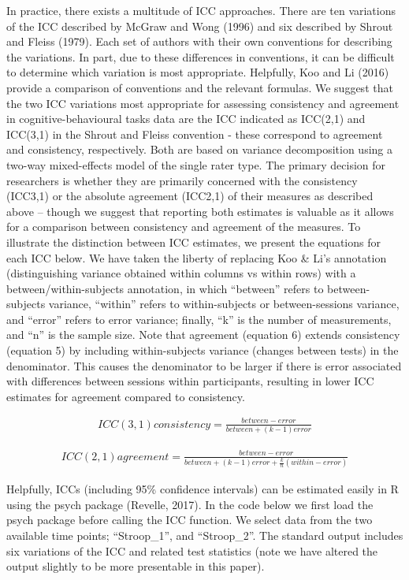 \documentclass[english,,man,floatsintext]{apa6}
\begin{document}
In practice, there exists a multitude of ICC approaches. There are ten variations of the ICC described by McGraw and Wong (1996) and six described by Shrout and Fleiss (1979). Each set of authors with their own conventions for describing the variations. In part, due to these differences in conventions, it can be difficult to determine which variation is most appropriate. Helpfully, Koo and Li (2016) provide a comparison of conventions and the relevant formulas. We suggest that the two ICC variations most appropriate for assessing consistency and agreement in cognitive-behavioural tasks data are the ICC indicated as ICC(2,1) and ICC(3,1) in the Shrout and Fleiss convention - these correspond to agreement and consistency, respectively. Both are based on variance decomposition using a two-way mixed-effects model of the single rater type. The primary decision for researchers is whether they are primarily concerned with the consistency (ICC3,1) or the absolute agreement (ICC2,1) of their measures as described above -- though we suggest that reporting both estimates is valuable as it allows for a comparison between consistency and agreement of the measures. To illustrate the distinction between ICC estimates, we present the equations for each ICC below. We have taken the liberty of replacing Koo \& Li's annotation (distinguishing variance obtained within columns vs within rows) with a between/within-subjects annotation, in which \enquote{between} refers to between-subjects variance, \enquote{within} refers to within-subjects or between-sessions variance, and \enquote{error} refers to error variance; finally, \enquote{k} is the number of measurements, and \enquote{n} is the sample size. Note that agreement (equation 6) extends consistency (equation 5) by including within-subjects variance (changes between tests) in the denominator. This causes the denominator to be larger if there is error associated with differences between sessions within participants, resulting in lower ICC estimates for agreement compared to consistency.

\begin{align}
ICC(3,1) consistency=\frac{between - error}{between + (k-1)error}  
\end{align}

\begin{align}
ICC(2,1) agreement=\frac{between - error}{between + (k-1)error + \frac{k}{n}(within - error)}  
\end{align}

Helpfully, ICCs (including 95\% confidence intervals) can be estimated easily in R using the psych package (Revelle, 2017). In the code below we first load the psych package before calling the ICC function. We select data from the two available time points; \enquote{Stroop\_1}, and \enquote{Stroop\_2}. The standard output includes six variations of the ICC and related test statistics (note we have altered the output slightly to be more presentable in this paper).
\end{document}
